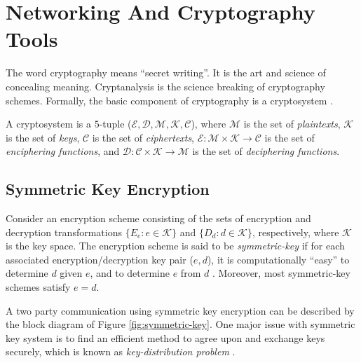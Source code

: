 \chapter{Networking And Cryptography Tools} %
\label{cha:Networking and Cryptography tools}

	The word cryptography means ``secret writing''.
	It is the art and science of concealing meaning.
	Cryptanalysis is the science breaking of cryptography schemes.
	Formally, the basic component of cryptography is a cryptosystem \cite{bishop2004introduction}.
	\begin{definition}
		A cryptosystem is a $5$-tuple ($ \mathcal{E,D,M,K,C}$), where $\mathcal{M}$ is the set of \textit{plaintexts}, $\mathcal{K}$ is the set of \textit{keys}, $\mathcal{C}$ is the set of \textit{ciphertexts}, $\mathcal{E}:\mathcal{M} \times \mathcal{K} \rightarrow \mathcal{C}$ is the set of \textit{enciphering functions}, and $\mathcal{D}:\mathcal{C} \times \mathcal{K} \rightarrow \mathcal{M}$ is the set of \textit{deciphering functions}.
	\end{definition}

\section{Symmetric Key Encryption}
	Consider an encryption scheme consisting of the sets of encryption and decryption transformations $\{E_{e}: e \in \mathcal{K}\}$ and $\{D_{d}: d \in \mathcal{K}\}$, respectively, where $\mathcal{K}$ is the key space.
	The encryption scheme is said to be \textit{symmetric-key} if for each associated encryption/decryption key pair ($e,d$), it is computationally ``easy'' to determine $d$ given $e$, and to determine $e$ from $d$ \cite{menezes2010handbook}.
	Moreover, most symmetric-key schemes satisfy $e = d$.

	A two party communication using symmetric key encryption can be described by the block diagram of Figure \ref{fig:symmetric-key}. 
	One major issue with symmetric key system is to find an efficient method to agree upon and exchange keys securely, which is known as \textit{key-distribution problem} \cite{menezes2010handbook}. 

